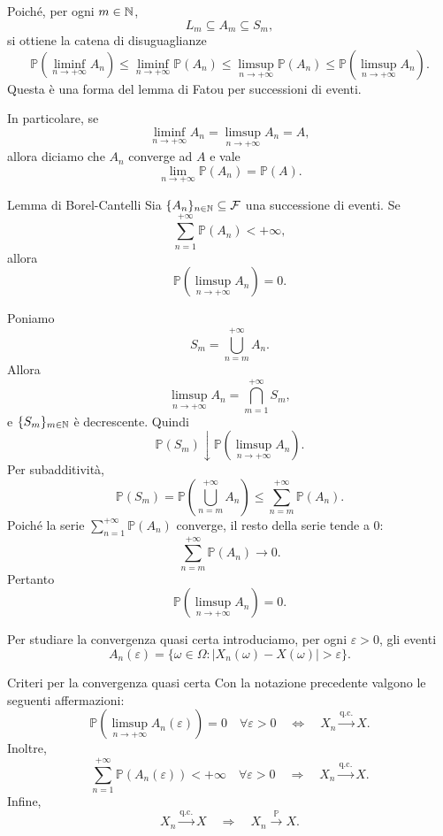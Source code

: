 \documentclass[a4paper]{article}
\begin{document}
Poiché, per ogni \(m\in\mathbb{N}\),
\[
    L_m\subseteq A_m\subseteq S_m,
\]
si ottiene la catena di disuguaglianze
\[
    \mathbb{P}\left(\liminf_{n\to+\infty}A_n\right)
    \leq
    \liminf_{n\to+\infty}\mathbb{P}(A_n)
    \leq
    \limsup_{n\to+\infty}\mathbb{P}(A_n)
    \leq
    \mathbb{P}\left(\limsup_{n\to+\infty}A_n\right).
\]
Questa è una forma del lemma di Fatou per successioni di eventi.

In particolare, se
\[
    \liminf_{n\to+\infty}A_n
    =
    \limsup_{n\to+\infty}A_n
    =
    A,
\]
allora diciamo che \(A_n\) converge ad \(A\) e vale
\[
    \lim_{n\to+\infty}\mathbb{P}(A_n)=\mathbb{P}(A).
\]

\begin{snippettheorem}{Lemma di Borel-Cantelli}
    Sia \(\{A_n\}_{n\in\mathbb{N}}\subseteq\mathcal{F}\) una successione di eventi. Se
    \[
        \sum_{n=1}^{+\infty}\mathbb{P}(A_n)<+\infty,
    \]
    allora
    \[
        \mathbb{P}\left(\limsup_{n\to+\infty}A_n\right)=0.
    \]
\end{snippettheorem}

\begin{snippetproof}{}
    Poniamo
    \[
        S_m=\bigcup_{n=m}^{+\infty}A_n.
    \]
    Allora
    \[
        \limsup_{n\to+\infty}A_n
        =
        \bigcap_{m=1}^{+\infty}S_m,
    \]
    e \(\{S_m\}_{m\in\mathbb{N}}\) è decrescente. Quindi
    \[
        \mathbb{P}(S_m)\downarrow
        \mathbb{P}\left(\limsup_{n\to+\infty}A_n\right).
    \]
    Per subadditività,
    \[
        \mathbb{P}(S_m)
        =
        \mathbb{P}\left(\bigcup_{n=m}^{+\infty}A_n\right)
        \leq
        \sum_{n=m}^{+\infty}\mathbb{P}(A_n).
    \]
    Poiché la serie \(\sum_{n=1}^{+\infty}\mathbb{P}(A_n)\) converge, il resto della serie tende a \(0\):
    \[
        \sum_{n=m}^{+\infty}\mathbb{P}(A_n)\longrightarrow 0.
    \]
    Pertanto
    \[
        \mathbb{P}\left(\limsup_{n\to+\infty}A_n\right)=0.
    \]
\end{snippetproof}

Per studiare la convergenza quasi certa introduciamo, per ogni \(\varepsilon>0\), gli eventi
\[
    A_n(\varepsilon)
    =
    \{\omega\in\Omega:|X_n(\omega)-X(\omega)|>\varepsilon\}.
\]

\begin{snippetproposition}{Criteri per la convergenza quasi certa}
    Con la notazione precedente valgono le seguenti affermazioni:
    \[
        \mathbb{P}\left(\limsup_{n\to+\infty}A_n(\varepsilon)\right)=0
        \quad
        \forall \varepsilon>0
        \quad
        \Longleftrightarrow
        \quad
        X_n\xrightarrow{\text{q.c.}}X.
    \]
    Inoltre,
    \[
        \sum_{n=1}^{+\infty}\mathbb{P}(A_n(\varepsilon))<+\infty
        \quad
        \forall \varepsilon>0
        \quad
        \Longrightarrow
        \quad
        X_n\xrightarrow{\text{q.c.}}X.
    \]
    Infine,
    \[
        X_n\xrightarrow{\text{q.c.}}X
        \quad
        \Longrightarrow
        \quad
        X_n\xrightarrow{\mathbb{P}}X.
    \]
\end{snippetproposition}
\end{document}
